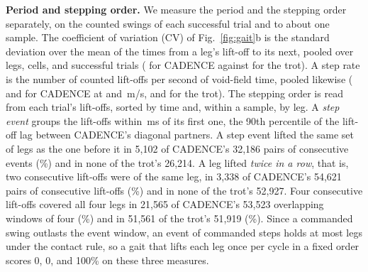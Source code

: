 \noindent\textbf{Period and stepping order.}
 We measure the period and the stepping order separately,
on the counted swings of each successful trial and to about one sample.
The coefficient of variation (CV) of Fig.~\ref{fig:gait}b is the
standard deviation over the mean of the times from a leg's lift-off to
its next, pooled over legs, cells, and successful trials
(\corlGaitStrideCv{} for CADENCE against \corlGaitStrideCvTrot{} for the
trot). A step rate is the number of counted lift-offs per second of
void-field time, pooled likewise (\corlGaitStepsSlow{} and
\corlGaitStepsFast{} for CADENCE at \corlBenchSpeedSlow{} and
\corlBenchSpeedFast\,m/s, and \corlGaitStepsTrot{} for the trot). The
stepping order is read from each trial's lift-offs, sorted by time and,
within a sample, by leg. A \emph{step event} groups the lift-offs within
\corlGaitEventWindowMs\,ms of its first one, the 90th percentile of the
lift-off lag between CADENCE's diagonal partners. A step event lifted
the same
set of legs as the one before it in 5{,}102 of CADENCE's 32{,}186 pairs
of consecutive events (\corlGaitEventRepeatPct\%) and in none of the
trot's 26{,}214. A leg lifted \emph{twice in a row}, that is, two
consecutive lift-offs were of the same leg, in 3{,}338 of CADENCE's
54{,}621 pairs of consecutive lift-offs (\corlGaitLegTwicePct\%) and in
none of the trot's 52{,}927. Four consecutive lift-offs covered all
four legs in 21{,}565 of CADENCE's 53{,}523 overlapping windows of four
(\corlGaitFourAllPct\%) and in 51{,}561 of the trot's 51{,}919
(\corlGaitFourAllPctTrot\%). Since a commanded swing outlasts the
event window, an event of commanded steps holds at most
\numberstringnum{\corlMaxConcurrentSwingLegs} legs under the contact
rule, so a gait that lifts each leg once per cycle in a fixed order
scores 0, 0, and 100\% on these three measures.
